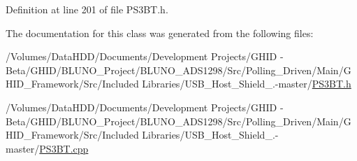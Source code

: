 \-Definition at line 201 of file \-P\-S3\-B\-T.\-h.



\-The documentation for this class was generated from the following files\-:\begin{DoxyCompactItemize}
\item 
/\-Volumes/\-Data\-H\-D\-D/\-Documents/\-Development Projects/\-G\-H\-I\-D -\/ Beta/\-G\-H\-I\-D/\-B\-L\-U\-N\-O\-\_\-\-Project/\-B\-L\-U\-N\-O\-\_\-\-A\-D\-S1298/\-Src/\-Polling\-\_\-\-Driven/\-Main/\-G\-H\-I\-D\-\_\-\-Framework/\-Src/\-Included Libraries/\-U\-S\-B\-\_\-\-Host\-\_\-\-Shield\-\_.-\/master/\hyperlink{_p_s3_b_t_8h}{\-P\-S3\-B\-T.\-h}\item 
/\-Volumes/\-Data\-H\-D\-D/\-Documents/\-Development Projects/\-G\-H\-I\-D -\/ Beta/\-G\-H\-I\-D/\-B\-L\-U\-N\-O\-\_\-\-Project/\-B\-L\-U\-N\-O\-\_\-\-A\-D\-S1298/\-Src/\-Polling\-\_\-\-Driven/\-Main/\-G\-H\-I\-D\-\_\-\-Framework/\-Src/\-Included Libraries/\-U\-S\-B\-\_\-\-Host\-\_\-\-Shield\-\_.-\/master/\hyperlink{_p_s3_b_t_8cpp}{\-P\-S3\-B\-T.\-cpp}\end{DoxyCompactItemize}
